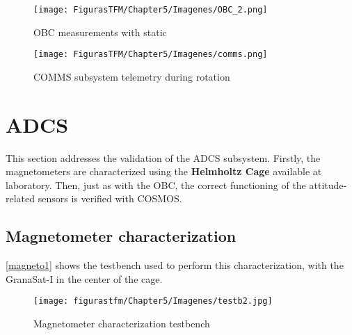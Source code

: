 \begin{landscape}
\vspace*{\fill}
	\begin{figure} [H]
			\centering
			\texttt{[image: FigurasTFM/Chapter5/Imagenes/OBC\_2.png]}
			\caption{\acrshort{OBC} measurements with static } 	\label{obcfig2}
			\vspace{-0.5cm}
\end{figure}
\vspace*{\fill}
\end{landscape}


\begin{landscape}
\vspace*{\fill}
	\begin{figure} [H]
			\centering
			\texttt{[image: FigurasTFM/Chapter5/Imagenes/comms.png]}
			\caption{COMMS subsystem telemetry during rotation} 	\label{commscosmo}
			\vspace{-0.5cm}
\end{figure}
\vspace*{\fill}
\end{landscape}


\section{ADCS}

This section addresses the validation of the \acrshort{ADCS} subsystem. Firstly, the magnetometers are characterized using the \textbf{Helmholtz Cage} available at  laboratory. Then, just as with the \acrshort{OBC}, the correct functioning of the attitude-related sensors is verified with COSMOS.

\subsection{Magnetometer characterization} 

\autoref{magneto1} shows the testbench used to perform this characterization, with the GranaSat-I in the center of the cage.

	\begin{figure} [H]
			\centering
			\texttt{[image: figurastfm/Chapter5/Imagenes/testb2.jpg]}
			\caption{Magnetometer characterization testbench} \label{magneto1}
\end{figure}


